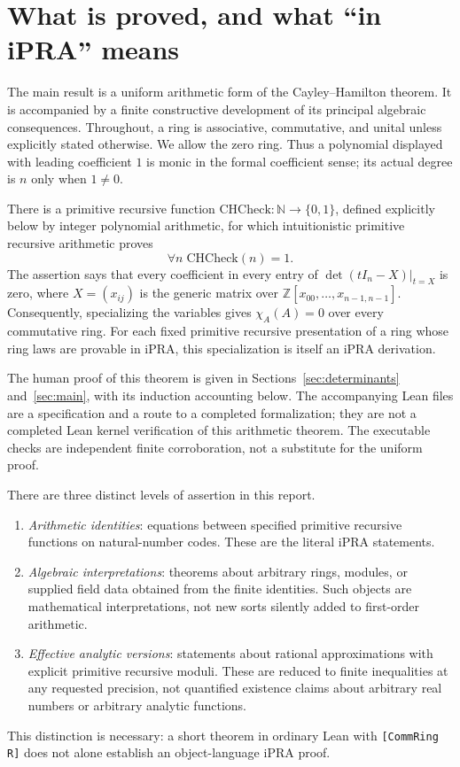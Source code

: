 \section{What is proved, and what ``in iPRA'' means}
\label{sec:foundations}

The main result is a uniform arithmetic form of the Cayley--Hamilton theorem.
It is accompanied by a finite constructive development of its principal
algebraic consequences. Throughout, a ring is associative, commutative, and
unital unless explicitly stated otherwise. We allow the zero ring. Thus a
polynomial displayed with leading coefficient $1$ is monic in the formal
coefficient sense; its actual degree is $n$ only when $1\ne0$.

\begin{theorem}
\label{thm:arithmetic}
There is a primitive recursive function $\mathrm{CHCheck}:\mathbb N\to
\{0,1\}$, defined explicitly below by integer polynomial arithmetic, for which
intuitionistic primitive recursive arithmetic proves
\[
                 \forall n\;\mathrm{CHCheck}(n)=1.
\]
The assertion says that every coefficient in every entry of
$\det(tI_n-X)\big|_{t=X}$ is zero, where $X=(x_{ij})$ is the generic matrix
over $\mathbb Z[x_{00},\ldots,x_{n-1,n-1}]$. Consequently, specializing the
variables gives $\chi_A(A)=0$ over every commutative ring. For each fixed
primitive recursive presentation of a ring whose ring laws are provable in
iPRA, this specialization is itself an iPRA derivation.
\end{theorem}

The human proof of this theorem is given in Sections~\ref{sec:determinants}
and~\ref{sec:main}, with its induction accounting below. The accompanying
Lean files are a specification and a route to a completed formalization;
they are not a completed Lean kernel verification of this arithmetic
theorem. The executable checks are independent finite corroboration, not
a substitute for the uniform proof.

There are three distinct levels of assertion in this report.
\begin{enumerate}
\item \emph{Arithmetic identities}: equations between specified primitive
recursive functions on natural-number codes. These are the literal iPRA
statements.
\item \emph{Algebraic interpretations}: theorems about arbitrary rings,
modules, or supplied field data obtained from the finite identities. Such
objects are mathematical interpretations, not new sorts silently added to
first-order arithmetic.
\item \emph{Effective analytic versions}: statements about rational
approximations with explicit primitive recursive moduli. These are reduced
to finite inequalities at any requested precision, not quantified
existence claims about arbitrary real numbers or arbitrary analytic
functions.
\end{enumerate}
This distinction is necessary: a short theorem in ordinary Lean with
\texttt{[CommRing R]} does not alone establish an object-language iPRA proof.

